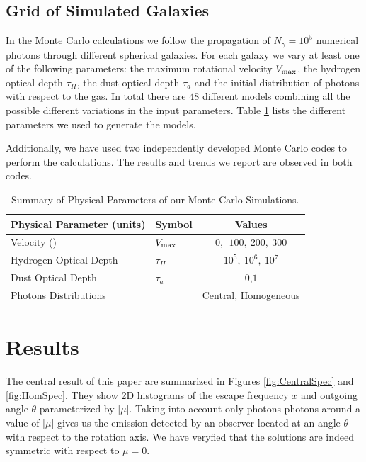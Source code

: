 \documentclass{emulateapj}
\newcommand{\kms}{{\ifmmode{{\mathrm{\,km\ s}^{-1}}}\else{\,km~s$^{-1}$}\fi}}
\begin{document}
\subsection{Grid of Simulated Galaxies}
\label{sec:models}

In the Monte Carlo calculations we follow the propagation of $N_{\gamma}=10^5$
numerical photons through different spherical galaxies. 
For each galaxy we vary at least one of the following parameters: the maximum
rotational velocity $V_{\rm max}$, the hydrogen optical depth $\tau_{H}$,
the dust optical depth $\tau_{a}$ and the initial distribution of photons
with respect to the gas. 
In total there are $48$ different models combining all the possible
different variations in the input parameters.
Table \ref{table:models} lists the different parameters we used to
generate the models.

Additionally, we have used two independently developed Monte Carlo
codes \citep{CLARA,DijkstraKramer} to perform the calculations. 
The results and trends we report are observed in both codes.  

\begin{table}
\begin{center}
\begin{tabular}{llc}\hline\hline
Physical Parameter (units) & Symbol & Values\\\hline
Velocity (\kms) & $V_{\rm max}$&$0,\ \ 100,\ 200,\ 300$\\
Hydrogen Optical Depth & $\tau_{H} $ & $10^{5},\ 10^{6},\ 10^{7}$\\
Dust Optical Depth & $\tau_{a}$ & $0$,$1$\\
Photons Distributions & & Central, Homogeneous\\\hline\hline
\end{tabular}
\caption{
  Summary of Physical Parameters of our Monte Carlo Simulations.} 
\label{table:models}
\end{center}
\end{table}




\section{Results}
\label{sec:results}

The central result of this paper are summarized in Figures
\ref{fig:CentralSpec} and \ref{fig:HomSpec}. 
They show 2D histograms of the escape frequency $x$ and outgoing angle
$\theta$ parameterized by $|\mu|$. 
Taking into account only photons photons around a value
of $|\mu|$ gives us the emission detected by an observer located at an
angle $\theta$ with respect to the rotation axis. 
We have veryfied that the solutions are indeed symmetric with respect
to $\mu=0$.   
\end{document}
